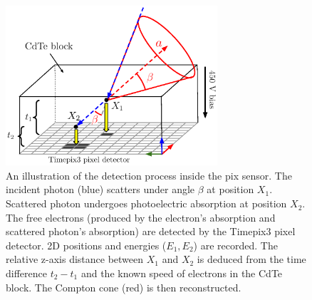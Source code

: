 \begin{figure}[!h]
    \centering
  \includegraphics[width=0.7\textwidth]{./fig/photos/my_minipix.eps}
    \caption{An illustration of the detection process inside the \ac{pix} sensor. 
    The incident photon (blue) scatters under angle $\beta$ at position $X_{1}$. 
    Scattered photon undergoes photoelectric absorption at position $X_{2}$. 
    The free electrons (produced by the electron's absorption and scattered photon's absorption) are detected by the Timepix3 pixel detector. 2D positions and energies ($E_{1}, E_{2}$) are recorded. 
    The relative z-axis distance between $X_{1}$ and $X_{2}$ is deduced from the time difference $t_{2}-t_{1}$ and the known speed of electrons in the \ac{CdTe} block.
    The Compton cone (red) is then reconstructed.}
    \label{fig:minipix}
\end{figure}

